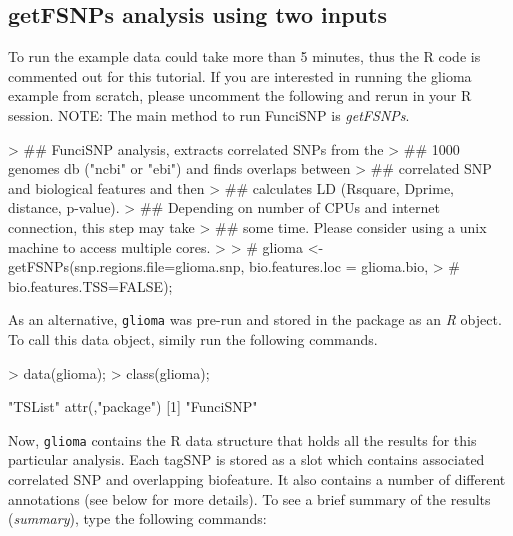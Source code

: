 \documentclass[12pt,fullpage]{article}
\newcommand{\Robject}[1]{{\texttt{#1}}}
\newcommand{\Rmethod}[1]{{\textit{#1}}}
\begin{document}
\subsection{getFSNPs analysis using two inputs}

To run the example data could take more than 5 minutes, thus the R code is
commented out for this tutorial. If you are interested in running the glioma
example from scratch, please uncomment the following and rerun in your R
session. NOTE: The main method to run FunciSNP is \Rmethod{getFSNPs}.

\begin{Schunk}
\begin{Sinput}
> ## FunciSNP analysis, extracts correlated SNPs from the 
> ## 1000 genomes db ("ncbi" or "ebi") and finds overlaps between 
> ## correlated SNP and biological features and then 
> ## calculates LD (Rsquare, Dprime, distance, p-value).
> ## Depending on number of CPUs and internet connection, this step may take 
> ## some time. Please consider using a unix machine to access multiple cores.
> 
> # glioma <- getFSNPs(snp.regions.file=glioma.snp, bio.features.loc = glioma.bio,
> # bio.features.TSS=FALSE);
\end{Sinput}
\end{Schunk}

As an alternative, \Robject{glioma} was pre-run and stored in the package as an
\textit{R} object. To call this data object, simily run the following commands. 

\begin{Schunk}
\begin{Sinput}
> data(glioma);
> class(glioma);
\end{Sinput}
\begin{Soutput}
[1] "TSList"
attr(,"package")
[1] "FunciSNP"
\end{Soutput}
\end{Schunk}

Now, \Robject{glioma} contains the R data structure that holds all the results
for this particular analysis. Each tagSNP is stored as a slot which contains
associated correlated SNP and overlapping biofeature. It also contains a number
of different annotations (see below for more details). To see a brief summary of
the results (\Rmethod{summary}), type the following commands:
\end{document}

